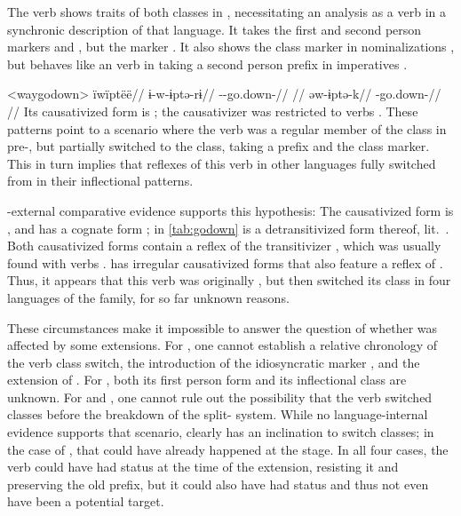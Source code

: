 

The verb shows traits of both classes in \wayana, necessitating an analysis as a  verb in a synchronic description of that language.
It takes the first and second person  markers  and  \parencite[200]{wayanatavares2005}, but the  marker  \parencite[206]{wayanatavares2005}.
It also shows the  class marker  in nominalizations , but behaves like an  verb in taking a second person prefix in imperatives .

\pex<waygodown>\wayana \parencite[][200]{wayanatavares2005}
\begingl
\glpreamble ïwïptëë//
\gla ɨ-w-ɨptə-rɨ//
\glb {}--go.down-//
\glft {}//
\endgl
{}
\begingl
\gla əw-ɨptə-k//
\glb {}-go.down-//
\glft {}//
\endgl
\xe
%
Its causativized form is  \parencite[255]{wayanatavares2005}; the \PC  causativizer  was restricted to  verbs \parencite{gildea2019overview}.
These patterns point to a scenario where the verb was a regular member of the  class in pre-\wayana, but partially switched to the  class, taking a  prefix and the  class marker.
This in turn implies that  reflexes of this verb in other languages fully switched from  in their inflectional patterns.

\wayana-external comparative evidence supports this hypothesis:
The \arara causativized form is  \parencite[66]{alves2017arara}, and \kalina has a cognate form  \parencite[263]{courtz2008carib};   in \cref{tab:godown} is a detransitivized form thereof, lit.\ .
Both causativized forms contain a reflex of the transitivizer , which was usually found with  verbs \parencite{gildea2019overview}.
\trio {} has irregular causativized forms that also feature a reflex of  \parencite[263]{triomeira1999}.
Thus, it appears that this verb was originally , but then switched its class in four  languages of the family, for so far unknown reasons.

These circumstances make it impossible to answer the question of whether  was affected by some extensions.
For \PTir, one cannot establish a relative chronology of the verb class switch, the introduction of the idiosyncratic marker , and the extension of .
For \PWai, both its first person form and its inflectional class are unknown.
For \carijo and \yukpa, one cannot rule out the possibility that the verb switched classes before the breakdown of the split- system.
While no language-internal evidence supports that scenario,  clearly has an inclination to switch classes; in the case of \carijo, that could have already happened at the \PTar stage.
In all four cases, the verb could have had  status at the time of the extension, resisting it and preserving the old prefix, but it could also have had  status and thus not even have been a potential target.

